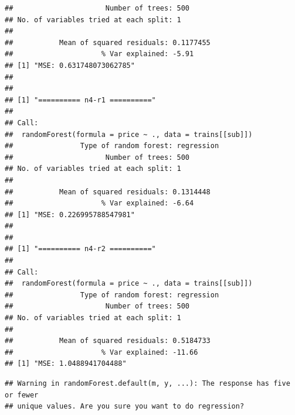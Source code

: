 \documentclass[
]{article}
\begin{document}
\begin{verbatim}
##                      Number of trees: 500
## No. of variables tried at each split: 1
## 
##           Mean of squared residuals: 0.1177455
##                     % Var explained: -5.91
## [1] "MSE: 0.631748073062785"
## 
## 
## [1] "========== n4-r1 =========="
## 
## Call:
##  randomForest(formula = price ~ ., data = trains[[sub]]) 
##                Type of random forest: regression
##                      Number of trees: 500
## No. of variables tried at each split: 1
## 
##           Mean of squared residuals: 0.1314448
##                     % Var explained: -6.64
## [1] "MSE: 0.226995788547981"
## 
## 
## [1] "========== n4-r2 =========="
## 
## Call:
##  randomForest(formula = price ~ ., data = trains[[sub]]) 
##                Type of random forest: regression
##                      Number of trees: 500
## No. of variables tried at each split: 1
## 
##           Mean of squared residuals: 0.5184733
##                     % Var explained: -11.66
## [1] "MSE: 1.0488941704488"
\end{verbatim}

\begin{verbatim}
## Warning in randomForest.default(m, y, ...): The response has five or fewer
## unique values. Are you sure you want to do regression?
\end{verbatim}
\end{document}
